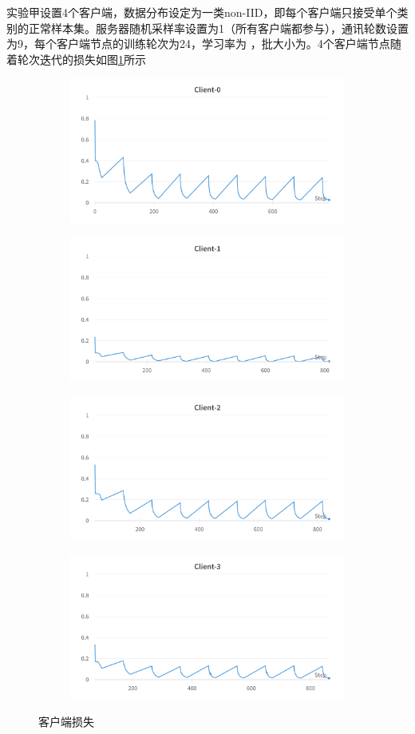实验甲设置4个客户端，数据分布设定为一类non-IID，即每个客户端只接受单个类别的正常样本集。\cite{zhaoFederatedLearningNonIID2022}服务器随机采样率设置为1（所有客户端都参与），通讯轮数设置为9，每个客户端节点的训练轮次为24，学习率为 ，批大小为。4个客户端节点随着轮次迭代的损失如图\ref{fig:4-client}所示
\begin{figure}[htbp]
    \centering
    \begin{subfigure}
        \centering
        \includegraphics[width=.4\linewidth]{figures/4-client/Client-0.png}  
      \end{subfigure}
      \begin{subfigure}
        \centering
        \includegraphics[width=.4\linewidth]{figures/4-client/Client-1.png} 
      \end{subfigure}
      \begin{subfigure}
        \centering
        \includegraphics[width=.4\linewidth]{figures/4-client/Client-2.png}  
      \end{subfigure}
      \begin{subfigure}
        \centering
        \includegraphics[width=.4\linewidth]{figures/4-client/Client-3.png} 
      \end{subfigure}
    \caption{客户端损失}
    \label{fig:4-client}
\end{figure}

